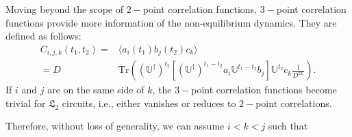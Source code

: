 \documentclass[aps,prx,twocolumn,notitlepage,nofootinbib,nobalancelastpage]{revtex4-2}
\theoremstyle{break}
\newcommand{\1}{\mathbbm{1}}
\theoremstyle{plain}
\theoremstyle{plain}
\theoremstyle{plain}
\newcommand{\Wgategreen}[2]{
\draw[very thick] (#1-0.5, #2 +0.5) -- (#1+0.5,#2-0.5);
\draw[very thick] (#1-0.5,#2-0.5) -- (#1+0.5,#2+0.5);
\draw[ thick, fill=mygreen, rounded corners=2pt] (#1-0.25,#2+0.25) rectangle (#1+0.25,#2-0.25);
\draw[thick] (#1,#2+0.15) -- (#1+0.15,#2+0.15) -- (#1+0.15,#2);
}
\newcommand{\MYcircle}[2]{
\draw[thick, fill=white] (#1,#2) circle (0.1cm); }
\newcommand{\MYcircleB}[2]{
\draw[thick, fill=black] (#1,#2) circle (0.1cm); }
\begin{document}
Moving beyond the scope of $2-$point correlation functions, $3-$point correlation functions provide more information of the non-equilibrium dynamics. They are defined as follows:
\begin{equation}
\begin{aligned}
C_{i,j,k}(t_{1},t_{2})=&\langle a_{i}(t_{1})b_{j}(t_{2})c_{k}\rangle\\
=D&\mathrm{Tr}\left((\mathbb{U}^\dagger)^{t_2}[(\mathbb{U}^\dagger)^{t_1-t_2}a_i\mathbb{U}^{t_1-t_2}b_j]\mathbb{U}^{t_2}c_k\frac{1}{D^{2L}}\right).
\end{aligned}
\end{equation}
If $i$ and $j$ are on the same side of $k$, the $3-$point correlation functions become trivial for $\mathfrak{L}_2$ circuits, i.e., either vanishes or reduces to $2-$point correlations.
\begin{comment}can be represented as follows: 

\begin{equation}
C_{i,j,k}(t_1,t_2)=
\begin{tikzpicture}[baseline=(current bounding box.center), scale=0.55]
\foreach \i in {0,...,4}
{
\Wgategreen{-\i}{\i}
\MYcircle{-\i-0.5}{\i-0.5}
}
\foreach \i in {0,...,4}
{
\Wgategreen{1-\i}{1+\i}
}
\foreach \i in{0,1,2}
{
\Wgategreen{2-\i}{2+\i}
\MYcircle{2.5-\i}{2.5+\i}
}
\MYcircle{1.5}{0.5}
\MYcircle{2.5}{1.5}
\MYcircle{-4.5}{4.5}
\MYcircle{-2.5}{5.5}
\MYcircle{-1.5}{4.5}
\MYcircleB{0.5}{-0.5}
\MYcircleB{-3.5}{5.5}
\MYcircleB{-0.5}{4.5}
\Text[x=0.5,y=-1]{$c$};
\Text[x=-3.5,y=6]{$a$};
\Text[x=-0.5,y=5]{$b$};
\end{tikzpicture}
.
\end{equation}
When related? to the $\mathfrak{L}_2$, this correlation function will disappear for traceless operators.
\end{comment}
Therefore, without loss of generality, we can assume $i<k<j$ such that
\end{document}
